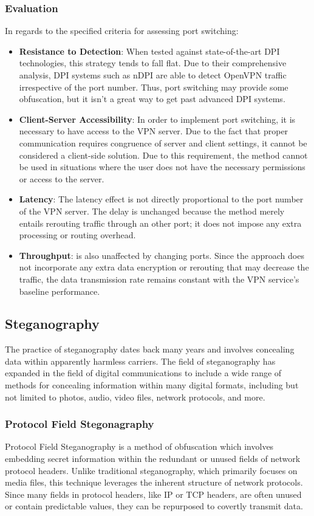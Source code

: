\documentclass[12pt, fleqn, a4paper]{article}
\begin{document}
\subsubsection{Evaluation}
In regards to the specified criteria for assessing port switching:
\begin{itemize}
\item \textbf{Resistance to Detection}: When tested against state-of-the-art DPI technologies, this strategy tends to fall flat. Due to their comprehensive analysis, DPI systems such as nDPI are able to detect OpenVPN traffic irrespective of the port number. Thus, port switching may provide some obfuscation, but it isn't a great way to get past advanced DPI systems.
\item \textbf{Client-Server Accessibility}: In order to implement port switching, it is necessary to have access to the VPN server. Due to the fact that proper communication requires congruence of server and client settings, it cannot be considered a client-side solution. Due to this requirement, the method cannot be used in situations where the user does not have the necessary permissions or access to the server.
\item \textbf{Latency}: The latency effect is not directly proportional to the port number of the VPN server. The delay is unchanged because the method merely entails rerouting traffic through an other port; it does not impose any extra processing or routing overhead.
\item \textbf{Throughput}: is also unaffected by changing ports. Since the approach does not incorporate any extra data encryption or rerouting that may decrease the traffic, the data transmission rate remains constant with the VPN service's baseline performance.
\end{itemize}

\subsection{Steganography}
The practice of steganography dates back many years and involves concealing data within apparently harmless carriers. The field of steganography has expanded in the field of digital communications to include a wide range of methods for concealing information within many digital formats, including but not limited to photos, audio, video files, network protocols, and more.
\subsubsection{Protocol Field Stegonagraphy}
Protocol Field Steganography is a method of obfuscation which involves embedding secret information within the redundant or unused fields of network protocol headers. Unlike traditional steganography, which primarily focuses on media files, this technique leverages the inherent structure of network protocols. Since many fields in protocol headers, like IP or TCP headers, are often unused or contain predictable values, they can be repurposed to covertly transmit data.
\end{document}
